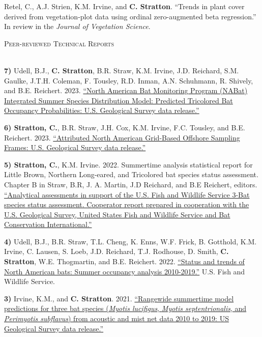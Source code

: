 \documentclass[a4paper]{article}
\newcommand{\lineunder} {
	\vspace*{-8pt} \\
	\hspace*{-18pt} \hrulefill \\
}
\newcommand{\header} [1] {
	{\hspace*{-18pt}\vspace*{6pt} \textcolor{Cerulean}{\textsc{#1}}}
	\vspace*{-6pt} \textcolor{Cerulean}{\lineunder}
}
\begin{document}
Retel, C., A.J. Strien, K.M. Irvine, and \textbf{C. Stratton}. ``Trends
in plant cover derived from vegetation-plot data using ordinal
zero-augmented beta regression.'' In review in the
\textit{Journal of Vegetation Science}. \vspace*{2mm}

\header{Peer-reviewed Technical Reports}
\vspace*{2mm}

\textbf{7)} Udell, B.J., \textbf{C. Stratton}, B.R. Straw, K.M. Irvine,
J.D. Reichard, S.M. Gaulke, J.T.H. Coleman, F. Tousley, R.D. Inman, A.N.
Schuhmann, R. Shively, and B.E. Reichert. 2023.
\href{https://doi.org/10.5066/P9MV37I7}{``North American Bat Monitoring
Program (NABat) Integrated Summer Species Distribution Model: Predicted
Tricolored Bat Occupancy Probabilities: U.S. Geological Survey data
release.''} \vspace*{2mm}

\textbf{6) Stratton, C.}, B.R. Straw, J.H. Cox, K.M. Irvine, F.C.
Tousley, and B.E. Reichert. 2023.
\href{https://doi.org/10.5066/P9H8NEOY}{``Attributed North American
Grid-Based Offshore Sampling Frames: U.S. Geological Survey data
release.''} \vspace*{2mm}

\textbf{5) Stratton, C.}, K.M. Irvine. 2022. Summertime analysis
statistical report for Little Brown, Northern Long-eared, and Tricolored
bat species status assessment. Chapter B in Straw, B.R, J. A. Martin,
J.D Reichard, and B.E Reichert, editors.
\href{https://doi.org/10.7944/P9B4RWEU}{``Analytical assessments in
support of the U.S. Fish and Wildlife Service 3-Bat species status
assessment. Cooperator report prepared in cooperation with the U.S.
Geological Survey, United States Fish and Wildlife Service and Bat
Conservation International.''} \vspace*{2mm}

\textbf{4)} Udell, B.J., B.R. Straw, T.L. Cheng, K. Enns, W.F. Frick, B.
Gotthold, K.M. Irvine, C. Lausen, S. Loeb, J.D. Reichard, T.J. Rodhouse,
D. Smith, \textbf{C. Stratton}, W.E. Thogmartin, and B.E. Reichert.
2022. \href{https://doi.org/10.5066/P92JGACB}{``Status and trends of
North American bats: Summer occupancy analysis 2010-2019.''} U.S. Fish
and Wildlife Service. \vspace*{2mm}

\textbf{3)} Irvine, K.M., and \textbf{C. Stratton}. 2021.
\href{https://doi.org/10.5066/P9XZ8D6N.}{``Rangewide summertime model
predictions for three bat species (\textit{Myotis lucifigus},
\textit{Myotis septentrionalis}, and \textit{Perimyotis subflavus}) from
acoustic and mist net data 2010 to 2019: US Geological Survey data
release.''} \vspace*{2mm}
\end{document}
